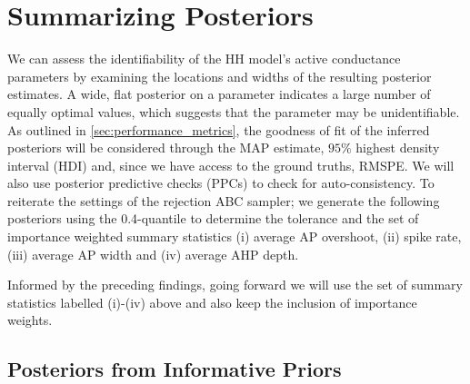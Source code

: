 \section{Summarizing Posteriors}

We can assess the identifiability of the HH model's active conductance parameters by examining the locations and widths of the resulting posterior estimates. A wide, flat posterior on a parameter indicates a large number of equally optimal values, which suggests that the parameter may be unidentifiable. As outlined in \cref{sec:performance_metrics}, the goodness of fit of the inferred posteriors will be considered through the MAP estimate, $95\%$ highest density interval (HDI) and, since we have access to the ground truths, RMSPE. We will also use posterior predictive checks (PPCs) to check for auto-consistency. To reiterate the settings of the rejection ABC sampler; we generate the following posteriors using the 0.4-quantile to determine the tolerance and the set of importance weighted summary statistics (i) average AP overshoot, (ii) spike rate, (iii) average AP width and (iv) average AHP depth.

Informed by the preceding findings, going forward we will use the set of summary statistics labelled (i)-(iv) above and also keep the inclusion of importance weights. 

\subsection{Posteriors from Informative Priors}

